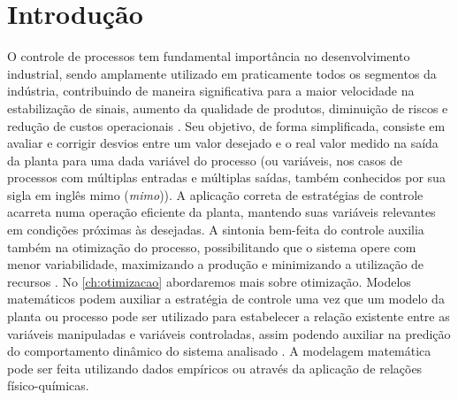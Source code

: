 
\chapter{Introdução}
\label{ch:introducao}

O controle de processos tem fundamental importância no desenvolvimento industrial,
sendo amplamente utilizado em praticamente todos os segmentos da indústria,
contribuindo de maneira significativa para a maior velocidade na estabilização de sinais,
aumento da qualidade de produtos, diminuição de riscos e redução de custos operacionais \cite{Ogata2010}.
Seu objetivo, de forma simplificada, consiste em avaliar e corrigir desvios entre um
valor desejado e o real valor medido na saída da planta para uma dada variável do
processo (ou variáveis, nos casos de processos com múltiplas entradas e múltiplas
saídas, também conhecidos por sua sigla em inglês \acrshort{mimo} (\textit{\acrlong{mimo}})).
A aplicação correta de estratégias de controle acarreta numa operação eficiente da
planta, mantendo suas variáveis relevantes em condições próximas às desejadas.
A sintonia bem-feita do controle auxilia também na otimização do processo,
possibilitando que o sistema opere com menor variabilidade, maximizando a produção
e minimizando a utilização de recursos  \cite{Ogata2010}. No \cref{ch:otimizacao} abordaremos mais
sobre otimização.
Modelos matemáticos podem auxiliar a estratégia de controle uma vez que um modelo da
planta ou processo pode ser utilizado para estabelecer a relação existente entre as
variáveis manipuladas e variáveis controladas, assim podendo auxiliar na predição do
comportamento dinâmico do sistema analisado \cite{Garcia2013}. A modelagem matemática pode ser feita
utilizando dados empíricos ou através da aplicação de relações físico-químicas.

